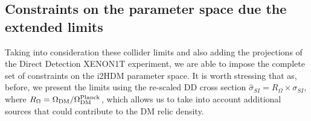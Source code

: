 \subsection{Constraints on the parameter space due the extended limits}

Taking into consideration these collider limits and also adding the projections of the Direct Detection XENON1T experiment,
we are able to impose the complete set of constraints on the i2HDM parameter space. 
It is worth stressing that as,  before, we  present the limits using  the re-scaled DD cross section 
$\hat{\sigma}_{SI}= R_\Omega\times \sigma_{SI}$, where $R_\Omega = \Omega_{\rm DM}/\Omega^{\rm Planck}_{\rm DM}$, which allows us to take into account additional sources that could contribute to the DM relic density. 

\begin{figure}[htb]
\vskip -0.5cm
%
\\
%

\end{figure}
